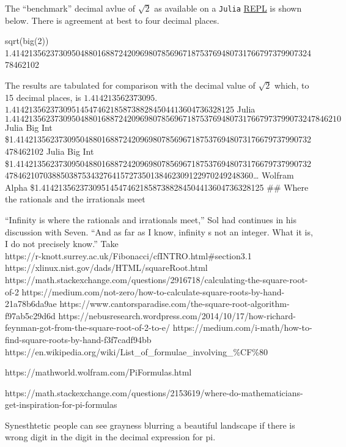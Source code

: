 \documentclass[
  a4paper,
]{article}
\newenvironment{Shaded}{\begin{snugshade}}{\end{snugshade}}
\newcommand{\FloatTok}[1]{\textcolor[rgb]{0.75,0.75,0.82}{#1}}
\newcommand{\FunctionTok}[1]{\textcolor[rgb]{0.94,0.94,0.56}{#1}}
\newcommand{\NormalTok}[1]{\textcolor[rgb]{0.80,0.80,0.80}{#1}}
\begin{document}
The ``benchmark'' decimal avlue of \(\sqrt{2}\) as available on a
\texttt{Julia}
\href{https://en.wikipedia.org/wiki/Read\%E2\%80\%93eval\%E2\%80\%93print_loop}{REPL}
is shown below. There is agreement at best to four decimal places.

\begin{Shaded}
\begin{Highlighting}[]
\FunctionTok{sqrt}\NormalTok{(}\FunctionTok{big}\NormalTok{(}\FloatTok{2}\NormalTok{))}
\FloatTok{1.414213562373095048801688724209698078569671875376948073176679737990732478462102}
\end{Highlighting}
\end{Shaded}

The results are tabulated for comparison with the decimal value of
\(\sqrt{2}\) which, to 15 decimal places, is \(1.414213562373095\).
\(1.4142135623730951454746218587388284504413604736328125\) Julia
\(1.41421356237309504880168872420969807856967187537694807317667973799073247846210\)
Julia Big Int
\$1.414213562373095048801688724209698078569671875376948073176679737990732478462102
Julia Big Int
\$1.4142135623730950488016887242096980785696718753769480731766797379907324784621070388503875343276415727350138462309122970249248360\ldots{}
Wolfram Alpha \$1.4142135623730951454746218587388284504413604736328125
\#\# Where the rationals and the irrationals meet

``Infinity is where the rationals and irrationals meet,'' Sol had
continues in his discussion with Seven. ``And as far as I know, infinity
s not an integer. What it is, I do not precisely know.'' Take \[
\] https://r-knott.surrey.ac.uk/Fibonacci/cfINTRO.html\#section3.1
https://xlinux.nist.gov/dads/HTML/squareRoot.html
https://math.stackexchange.com/questions/2916718/calculating-the-square-root-of-2
https://medium.com/not-zero/how-to-calculate-square-roots-by-hand-21a78b6da9ae
https://www.cantorsparadise.com/the-square-root-algorithm-f97ab5c29d6d
https://nebusresearch.wordpress.com/2014/10/17/how-richard-feynman-got-from-the-square-root-of-2-to-e/
https://medium.com/i-math/how-to-find-square-roots-by-hand-f3f7cadf94bb
https://en.wikipedia.org/wiki/List\_of\_formulae\_involving\_\%CF\%80

https://mathworld.wolfram.com/PiFormulas.html

https://math.stackexchange.com/questions/2153619/where-do-mathematicians-get-inspiration-for-pi-formulas

Synesthtetic people can see grayness blurring a beautiful landscape if
there is wrong digit in the digit in the decimal expression for pi.
\end{document}
